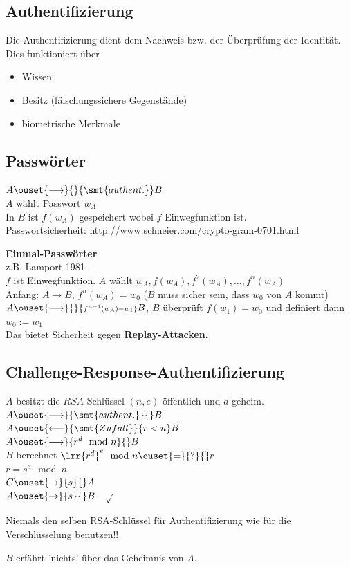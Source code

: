 	\subsection{Authentifizierung}
		Die Authentifizierung dient dem Nachweis bzw. der Überprüfung der Identität. Dies funktioniert über
		\begin{itemize}
			\item Wissen
			\item Besitz (fälschungssichere Gegenstände)
			\item biometrische Merkmale
		\end{itemize}
	
	\subsection{Passwörter}
		$A\ouset{\longrightarrow}{}{\smt{authent.}} B$\\
		$A$ wählt Passwort $w_A$\\
		In $B$ ist $f(w_A)$ gespeichert wobei $f$ Einwegfunktion ist.\\
		Passwortsicherheit: http://www.schneier.com/crypto-gram-0701.html
	
		\textbf{Einmal-Passwörter}\\
		z.B. Lamport 1981\\
		$f$ ist Einwegfunktion. $A$ wählt $w_A, f(w_A),f^2(w_A),\dots,f^n(w_A)$\\
		Anfang: $A\rightarrow B$, $f^n(w_A)=w_0$ ($B$ muss sicher sein, dass $w_0$ von $A$ kommt)\\
		$A\ouset{\longrightarrow}{}{\scriptstyle f^{n-1}(w_A)=w_1} B$, $B$ überprüft $f(w_1)=w_0$ und definiert dann $w_0:=w_1$\\
		Das bietet Sicherheit gegen \textbf{Replay-Attacken}.
	
	\subsection{Challenge-Response-Authentifizierung}
		$A$ besitzt die $RSA$-Schlüssel $(n,e)$ öffentlich und $d$ geheim.\\
		$A\ouset{\longrightarrow}{\smt{authent.}}{}B$\\
		$A\ouset{\longleftarrow}{\smt{Zufall}}{r<n}B$\\
		$A\ouset{\longrightarrow}{r^d\mod n}{}B$\\
		$B$ berechnet $\lrr{r^d}^e\mod n\ouset{=}{?}{} r$\\
		$r=s^e\mod n$\\
		$C\ouset{\rightarrow}{s}{}A$\\
		$A\ouset{\rightarrow}{s}{}B\quad\sqrt{}$
	
		Niemals den selben RSA-Schlüssel für Authentifizierung wie für die Verschlüsselung benutzen!!
	
		$B$ erfährt 'nichts' über das Geheimnis von $A$.
